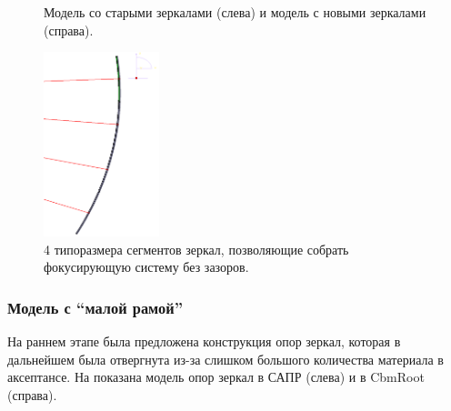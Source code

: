 \begin{figure}[H]
\begin{minipage}[b]{0.495\textwidth}
\end{minipage}
\caption{Модель со старыми зеркалами (слева) и модель с новыми зеркалами (справа).}
\label{fig:MCgeoMirrorsEvolution}
\end{figure}

\begin{figure}[H]
\centering
\includegraphics[width=0.3\textwidth]{pictures/Mirrors_4types_of_segments.png}
\caption{4 типоразмера сегментов зеркал, позволяющие собрать фокусирующую систему без зазоров.}
\label{fig:Mirrors4types}
\end{figure}

\subsubsection{Модель с ``малой рамой''}\label{sec:secModelWithSmallFrame}

На раннем этапе была предложена конструкция опор зеркал, которая в дальнейшем была отвергнута из-за слишком большого количества материала в аксептансе. На  показана модель опор зеркал в САПР (слева) и в CbmRoot (справа).


